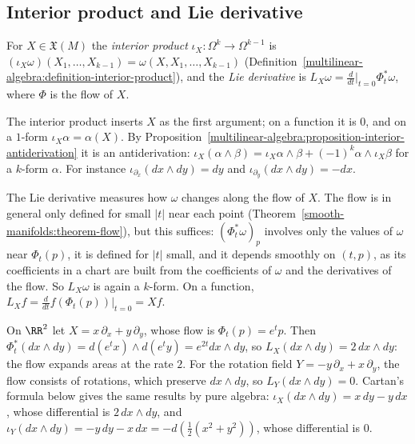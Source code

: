 \subsection{Interior product and Lie derivative}\label{differential-forms:subsection-lie}

\begin{definition}\label{differential-forms:definition-interior-lie}
For $X \in \mathfrak{X}(M)$ the \emph{interior product} $\iota_X \colon \Omega^k \to \Omega^{k-1}$ is $(\iota_X\omega)(X_1, \ldots, X_{k-1}) = \omega(X, X_1, \ldots, X_{k-1})$
(Definition~\ref{multilinear-algebra:definition-interior-product}), and the \emph{Lie derivative} is $L_X\omega = \frac{d}{dt}\big|_{t=0}\Phi_t^*\omega$, where $\Phi$ is the flow of $X$.
\end{definition}

The interior product inserts $X$ as the first argument; on a function it is $0$, and on a $1$-form $\iota_X\alpha = \alpha(X)$. By
Proposition~\ref{multilinear-algebra:proposition-interior-antiderivation} it is an antiderivation: $\iota_X(\alpha \wedge \beta) = \iota_X\alpha \wedge \beta + (-1)^k\alpha \wedge \iota_X\beta$ for a
$k$-form $\alpha$. For instance $\iota_{\partial_x}(dx \wedge dy) = dy$ and $\iota_{\partial_y}(dx \wedge dy) = -dx$.

The Lie derivative measures how $\omega$ changes along the flow of $X$. The flow is in general only defined for small $|t|$ near each point
(Theorem~\ref{smooth-manifolds:theorem-flow}), but this suffices: $(\Phi_t^*\omega)_p$ involves only the values of $\omega$ near $\Phi_t(p)$, it is defined for $|t|$ small, and it depends
smoothly on $(t, p)$, as its coefficients in a chart are built from the coefficients of $\omega$ and the derivatives of the flow. So $L_X\omega$ is again a $k$-form. On a function,
$L_Xf = \frac{d}{dt}f(\Phi_t(p))|_{t=0} = Xf$.

\begin{example}\label{differential-forms:example-lie-derivative}
On $\RR^2$ let $X = x\,\partial_x + y\,\partial_y$, whose flow is $\Phi_t(p) = e^tp$. Then $\Phi_t^*(dx \wedge dy) = d(e^tx) \wedge d(e^ty) = e^{2t}dx \wedge dy$, so
$L_X(dx \wedge dy) = 2\,dx \wedge dy$: the flow expands areas at the rate $2$. For the rotation field $Y = -y\,\partial_x + x\,\partial_y$, the flow consists of rotations, which preserve
$dx \wedge dy$, so $L_Y(dx \wedge dy) = 0$. Cartan's formula below gives the same results by pure algebra: $\iota_X(dx \wedge dy) = x\,dy - y\,dx$, whose differential is $2\,dx \wedge dy$, and
$\iota_Y(dx \wedge dy) = -y\,dy - x\,dx = -d(\frac12(x^2 + y^2))$, whose differential is $0$.
\end{example}

